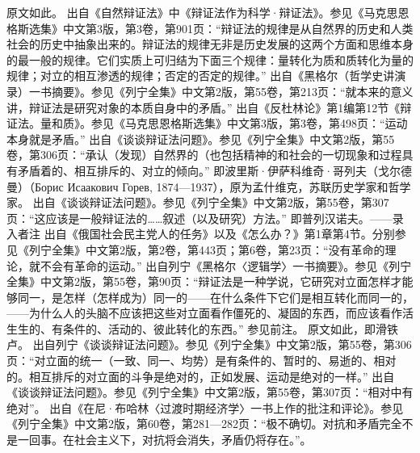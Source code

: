 \begin{maonote}
原文如此。
出自《自然辩证法》中《辩证法作为科学·辩证法》。参见《马克思恩格斯选集》中文第3版，第3卷，第901页：“辩证法的规律是从自然界的历史和人类社会的历史中抽象出来的。辩证法的规律无非是历史发展的这两个方面和思维本身的最一般的规律。它们实质上可归结为下面三个规律：量转化为质和质转化为量的规律；对立的相互渗透的规律；否定的否定的规律。”
出自《黑格尔（哲学史讲演录）一书摘要》。参见《列宁全集》中文第2版，第55卷，第213页：“就本来的意义讲，辩证法是研究对象的本质自身中的矛盾。”
出自《反杜林论》第1编第12节《辩证法。量和质》。参见《马克思恩格斯选集》中文第3版，第3卷，第498页：“运动本身就是矛盾。”
出自《谈谈辩证法问题》。参见《列宁全集》中文第2版，第55卷，第306页：“承认（发现）自然界的（也包括精神的和社会的一切现象和过程具有矛盾着的、相互排斥的、对立的倾向。”
即波里斯·伊萨科维奇·哥列夫（戈尔德曼）（Борис Исаакович Горев, 1874—1937），原为孟什维克，苏联历史学家和哲学家。
出自《谈谈辩证法问题》。参见《列宁全集》中文第2版，第55卷，第307页：“这应该是一般辩证法的……叙述（以及研究）方法。”
即普列汉诺夫。——录入者注
出自《俄国社会民主党人的任务》以及《怎么办？》第1章第4节。分别参见《列宁全集》中文第2版，第2卷，第443页；第6卷，第23页：“没有革命的理论，就不会有革命的运动。”
出自列宁《黑格尔〈逻辑学〉一书摘要》。参见《列宁全集》中文第2版，第55卷，第90页：“辩证法是一种学说，它研究对立面怎样才能够同一，是怎样（怎样成为）同一的——在什么条件下它们是相互转化而同一的，——为什么人的头脑不应该把这些对立面看作僵死的、凝固的东西，而应该看作活生生的、有条件的、活动的、彼此转化的东西。”
参见前注。
原文如此，即滑铁卢。
出自列宁《谈谈辩证法问题》。参见《列宁全集》中文第2版，第55卷，第306页：“对立面的统一（一致、同一、均势）是有条件的、暂时的、易逝的、相对的。相互排斥的对立面的斗争是绝对的，正如发展、运动是绝对的一样。”
出自《谈谈辩证法问题》。参见《列宁全集》中文第2版，第55卷，第307页：“相对中有绝对”。
出自《在尼·布哈林〈过渡时期经济学〉一书上作的批注和评论》。参见《列宁全集》中文第2版，第60卷，第281—282页：“极不确切。对抗和矛盾完全不是一回事。在社会主义下，对抗将会消失，矛盾仍将存在。”。
\end{maonote}
